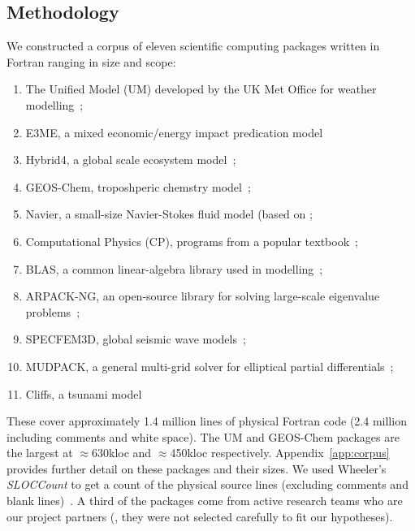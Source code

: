 \subsection{Methodology}
%
\noindent
We constructed a corpus of eleven scientific computing packages
written in Fortran ranging in size and scope:
%
\begin{enumerate}[leftmargin=1.5em]
\item The Unified Model (UM) developed by the UK Met Office
for weather modelling~\cite{um};
\item E3ME, a mixed economic/energy impact predication
  model~\cite{RePEc:aen:journl:2006se-a12}

\item Hybrid4, a global scale ecosystem model~\cite{GBC:GBC635};

\item GEOS-Chem, troposhperic chemstry model~\cite{geos-chem};

\item Navier, a small-size Navier-Stokes fluid model (based
  on \cite{griebel1997numerical};

\item Computational Physics (CP), programs from a popular
 textbook~\cite{giordano1997computational};

\item BLAS, a common linear-algebra
  library used in modelling~\cite{blas};

\item ARPACK-NG, an open-source library for solving large-scale
eigenvalue problems~\cite{arpackng};

\item SPECFEM3D, global seismic wave models~\cite{specfem3d};

\item MUDPACK, a general multi-grid solver for elliptical
partial differentials~\cite{MUD};

\item Cliffs, a tsunami model~\cite{tolkova2014land}
\end{enumerate}
%
These cover approximately 1.4 million lines of physical Fortran code
(2.4 million including comments and white space).  The UM and
GEOS-Chem packages are the largest at $\approx$630kloc and
$\approx$450kloc respectively.  Appendix~\ref{app:corpus} provides
further detail on these packages and their sizes.  We used Wheeler's
\emph{SLOCCount} to get a count of the physical source lines
(excluding comments and blank lines)~\cite{wheeler2001sloccount}.
A third of the packages come from active research teams who are our project
partners (\ie{}, they were not selected carefully to fit our
hypotheses).


